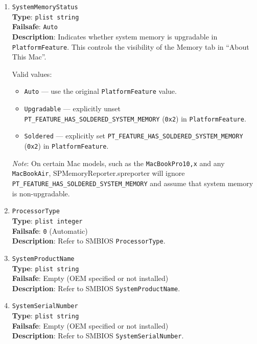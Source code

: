 \documentclass[]{article}
\providecommand{\tightlist}{%
  \setlength{\itemsep}{0pt}\setlength{\parskip}{0pt}}
\begin{document}
\begin{enumerate}
\item
  \texttt{SystemMemoryStatus}\\
  \textbf{Type}: \texttt{plist\ string}\\
  \textbf{Failsafe}: \texttt{Auto}\\
  \textbf{Description}: Indicates whether system memory is upgradable in \texttt{PlatformFeature}.
  This controls the visibility of the Memory tab in ``About This Mac''.

  Valid values:

  \begin{itemize}
    \tightlist
    \item \texttt{Auto} --- use the original \texttt{PlatformFeature} value.
    \item \texttt{Upgradable} --- explicitly unset \texttt{PT\_FEATURE\_HAS\_SOLDERED\_SYSTEM\_MEMORY}
    (\texttt{0x2}) in \texttt{PlatformFeature}.
    \item \texttt{Soldered} --- explicitly set \texttt{PT\_FEATURE\_HAS\_SOLDERED\_SYSTEM\_MEMORY}
    (\texttt{0x2}) in \texttt{PlatformFeature}.
  \end{itemize}

  \emph{Note}: On certain Mac models, such as the \texttt{MacBookPro10,x} and any \texttt{MacBookAir},
  SPMemoryReporter.spreporter will ignore \texttt{PT\_FEATURE\_HAS\_SOLDERED\_SYSTEM\_MEMORY}
  and assume that system memory is non-upgradable.

\item
  \texttt{ProcessorType}\\
  \textbf{Type}: \texttt{plist\ integer}\\
  \textbf{Failsafe}: \texttt{0} (Automatic)\\
  \textbf{Description}: Refer to SMBIOS \texttt{ProcessorType}.
\item
  \texttt{SystemProductName}\\
  \textbf{Type}: \texttt{plist\ string}\\
  \textbf{Failsafe}: Empty (OEM specified or not installed)\\
  \textbf{Description}: Refer to SMBIOS \texttt{SystemProductName}.
\item
  \texttt{SystemSerialNumber}\\
  \textbf{Type}: \texttt{plist\ string}\\
  \textbf{Failsafe}: Empty (OEM specified or not installed)\\
  \textbf{Description}: Refer to SMBIOS \texttt{SystemSerialNumber}.


\end{enumerate}
\end{document}
